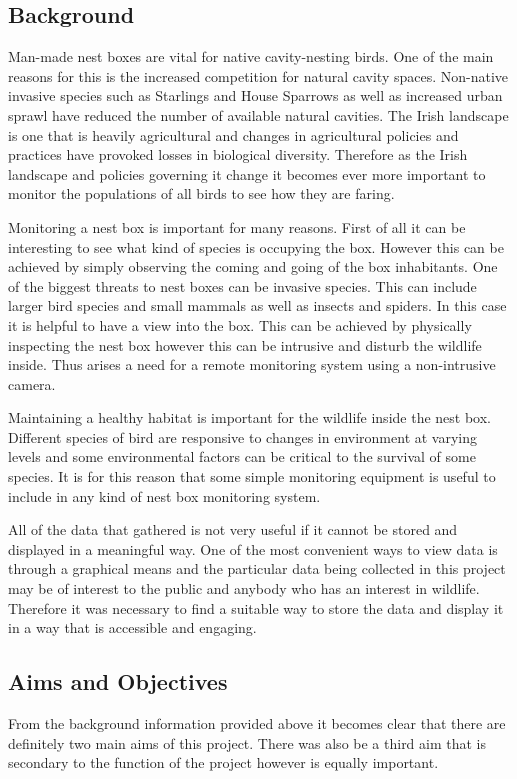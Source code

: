 \documentclass[10pt,a4paper]{article}
\begin{document}
\subsection{Background}
Man-made nest boxes are vital for native cavity-nesting birds. One of the main reasons for this is the increased competition for natural cavity spaces. Non-native invasive species such as Starlings and House Sparrows as well as increased urban sprawl have reduced the number of available natural cavities. The Irish landscape is one that is heavily agricultural and changes in agricultural policies and practices have provoked losses in biological diversity\cite{PIERRET201814}. Therefore as the Irish landscape and policies governing it change it becomes ever more important to monitor the populations of all birds to see how they are faring\cite{website:birdwatchireland}. 

Monitoring a nest box is important for many reasons. First of all it can be interesting to see what kind of species is occupying the box. However this can be achieved by simply observing the coming and going of the box inhabitants. One of the biggest threats to nest boxes can be invasive species. This can include larger bird species and small mammals as well as insects and spiders. In this case it is helpful to have a view into the box. This can be achieved by physically inspecting the nest box however this can be intrusive and disturb the wildlife inside. Thus arises a need for a remote monitoring system using a non-intrusive camera. 

Maintaining a healthy habitat is important for the wildlife inside the nest box. Different species of bird are responsive to changes in environment at varying levels and some environmental factors can be critical to the survival of some species\cite{wormworth06}. It is for this reason that some simple monitoring equipment is useful to include in any kind of nest box monitoring system.

All of the data that gathered is not very useful if it cannot be stored and displayed in a meaningful way. One of the most convenient ways to view data is through a graphical means and the particular data being collected in this project may be of interest to the public and anybody who has an interest in wildlife. Therefore it was necessary to find a suitable way to store the data and display it in a way that is accessible and engaging. 

\subsection{Aims and Objectives}
From the background information provided above it becomes clear that there are definitely two main aims of this project. There was also be a third aim that is secondary to the function of the project however is equally important. 
\end{document}
